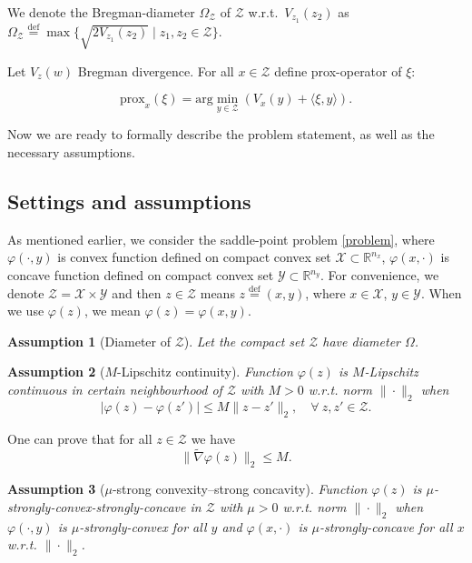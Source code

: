 \documentclass[runningheads]{llncs}
\def\eqdef{\overset{\text{def}}{=}}
\newtheorem{assumption}{Assumption}
\begin{document}
We denote the Bregman-diameter $\Omega_{\mathcal{Z}}$ of $\mathcal{Z}$ w.r.t.\ $V_{z_1}(z_2)$ as \\
$\Omega_{\mathcal{Z}} \eqdef \max\{\sqrt{2V_{z_1}(z_2)}\mid z_1, z_2 \in \mathcal{Z}\}$.

\begin{definition}
Let $V_z(w)$ Bregman divergence. For all $x \in \mathcal{Z}$ define prox-operator of $\xi$:
\end{definition}
\begin{equation*}
    \text{prox}_x (\xi) = \text{arg}\min_{y \in \mathcal{Z}} \left(V_x(y) + \langle \xi , y \rangle \right).
\end{equation*}

Now we are ready to formally describe the problem statement, as well as the necessary assumptions.

\subsection{Settings and assumptions}

As mentioned earlier, we consider the saddle-point problem \eqref{problem}, where $\varphi(\cdot, y)$ is convex function defined on compact convex set $\mathcal{X} \subset \mathbb{R}^{n_x}$,  $\varphi(x,\cdot)$ is concave function defined on compact convex set $\mathcal{Y} \subset \mathbb{R}^{n_y}$. For convenience, we denote $\mathcal{Z} =  \mathcal{X} \times  \mathcal{Y}$  and then $z\in \mathcal{Z} $ means $z \eqdef (x,y)$, where $x \in \mathcal{X}$,  $y \in \mathcal{Y}$.  When we use $\varphi(z)$, we mean $\varphi(z) = \varphi(x,y)$.

\begin{assumption}[Diameter of $\mathcal{Z}$] 
Let the compact set $\mathcal{Z}$ have diameter $\Omega$.
\end{assumption}


\begin{assumption}[$M$-Lipschitz continuity]
Function $\varphi(z)$ is $M$-Lipschitz continuous in certain neighbourhood of $\mathcal{Z}$ with $M > 0$ w.r.t. norm $\|\cdot\|_2$ when 
\begin{equation*}
| \varphi(z)- \varphi(z')|\leq M\|z-z'\|_2, \quad \forall\ z, z'\in \mathcal{Z}.
\end{equation*}
\end{assumption}
One can prove that for all $z\in \mathcal{Z}$ we have 
\begin{equation}
\label{bound}
\|\tilde \nabla \varphi(z)\|_2 \leq M.
\end{equation}
\begin{assumption}[$\mu$-strong convexity--strong concavity]
Function $\varphi(z)$ is $\mu$-strongly-convex-strongly-concave in $\mathcal{Z}$ with $\mu > 0$ w.r.t. norm $\|\cdot\|_2$ when  $\varphi(\cdot, y)$ is $\mu$-strongly-convex for all $y$ and  $\varphi(x, \cdot)$ is $\mu$-strongly-concave for all $x$ w.r.t. $\| \cdot \|_2$.
\end{assumption}
\end{document}
